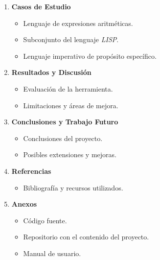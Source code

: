 \documentclass[11pt]{article}
\begin{document}
\begin{enumerate}
\item \textbf{Casos de Estudio}

  \begin{itemize}
  \item Lenguaje de expresiones aritméticas.
  \item Subconjunto del lenguaje \textit{LISP}.
  \item Lenguaje imperativo de propósito específico.
  \end{itemize}

\item \textbf{Resultados y Discusión}

  \begin{itemize}
  \item Evaluación de la herramienta.
  \item Limitaciones y áreas de mejora.
  \end{itemize}

\item \textbf{Conclusiones y Trabajo Futuro}

  \begin{itemize}
  \item Conclusiones del proyecto.
  \item Posibles extensiones y mejoras.
  \end{itemize}
\item \textbf{Referencias}

  \begin{itemize}
  \item Bibliografía y recursos utilizados.
  \end{itemize}

\item \textbf{Anexos}

  \begin{itemize}
  \item Código fuente.
  \item Repositorio con el contenido del proyecto.
  \item Manual de usuario.
  \end{itemize}
\end{enumerate}
\end{document}
